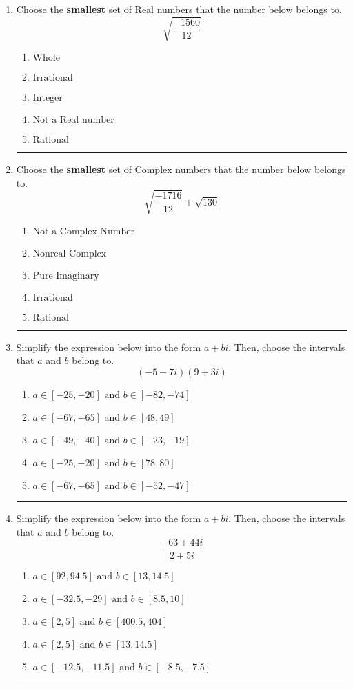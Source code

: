 \documentclass[14pt]{extbook}
\newcommand{\litem}[1]{\item#1\hspace*{-1cm}\rule{\textwidth}{0.4pt}}
\begin{document}
\begin{enumerate}
\litem{
Choose the \textbf{smallest} set of Real numbers that the number below belongs to.\[ \sqrt{\frac{-1560}{12}} \]\begin{enumerate}[label=\Alph*.]
\item \( \text{Whole} \)
\item \( \text{Irrational} \)
\item \( \text{Integer} \)
\item \( \text{Not a Real number} \)
\item \( \text{Rational} \)

\end{enumerate} }
\litem{
Choose the \textbf{smallest} set of Complex numbers that the number below belongs to.\[ \sqrt{\frac{-1716}{12}}+\sqrt{130} \]\begin{enumerate}[label=\Alph*.]
\item \( \text{Not a Complex Number} \)
\item \( \text{Nonreal Complex} \)
\item \( \text{Pure Imaginary} \)
\item \( \text{Irrational} \)
\item \( \text{Rational} \)

\end{enumerate} }
\litem{
Simplify the expression below into the form $a+bi$. Then, choose the intervals that $a$ and $b$ belong to.\[ (-5 - 7 i)(9 + 3 i) \]\begin{enumerate}[label=\Alph*.]
\item \( a \in [-25, -20] \text{ and } b \in [-82, -74] \)
\item \( a \in [-67, -65] \text{ and } b \in [48, 49] \)
\item \( a \in [-49, -40] \text{ and } b \in [-23, -19] \)
\item \( a \in [-25, -20] \text{ and } b \in [78, 80] \)
\item \( a \in [-67, -65] \text{ and } b \in [-52, -47] \)

\end{enumerate} }
\litem{
Simplify the expression below into the form $a+bi$. Then, choose the intervals that $a$ and $b$ belong to.\[ \frac{-63 + 44 i}{2 + 5 i} \]\begin{enumerate}[label=\Alph*.]
\item \( a \in [92, 94.5] \text{ and } b \in [13, 14.5] \)
\item \( a \in [-32.5, -29] \text{ and } b \in [8.5, 10] \)
\item \( a \in [2, 5] \text{ and } b \in [400.5, 404] \)
\item \( a \in [2, 5] \text{ and } b \in [13, 14.5] \)
\item \( a \in [-12.5, -11.5] \text{ and } b \in [-8.5, -7.5] \)


\end{enumerate}}
\end{enumerate}
\end{document}
